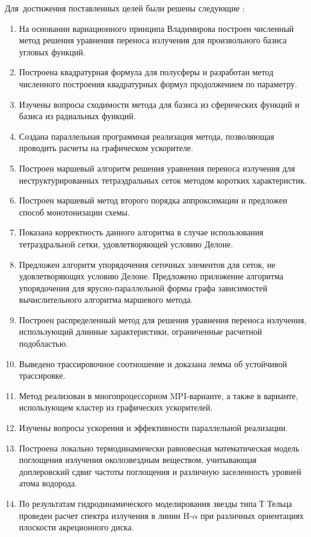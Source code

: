 Для~достижения поставленных целей были решены следующие {\tasks}:
\begin{enumerate}
  \item На основании вариационного принципа Владимирова построен численный метод решения уравнения переноса излучения для произвольного базиса угловых функций.
  \item Построена квадратурная формула для полусферы и разработан метод численного построения квадратурных формул продолжением по параметру.
  \item Изучены вопросы сходимости метода для базиса из сферических функций и базиса из радиальных функций.
  \item Создана параллельная программная реализация метода, позволяющая проводить расчеты на графическом ускорителе.
  
  \item Построен маршевый алгоритм решения уравнения переноса излучения для неструктурированных тетраэдральных сеток методом коротких характеристик.
  \item Построен маршевый метод второго порядка аппроксимации и предложен способ монотонизации схемы.
  \item Показана корректность данного алгоритма в случае использования тетраэдральной сетки, удовлетворяющей условию Делоне.
  \item Предложен алгоритм упорядочения сеточных элементов для сеток, не удовлетворяющих условию Делоне. Предложено приложение алгоритма упорядочения для ярусно-параллельной формы графа зависимостей вычислительного алгоритма маршевого метода.
  
  \item Построен распределенный метод для решения уравнения переноса излучения, использующий длинные характеристики, ограниченные расчетной подобластью.
  \item Выведено трассировочное соотношение и доказана лемма об устойчивой трассировке.
  \item Метод реализован в многопроцессорном MPI-варианте, а также в варианте, использующем кластер из графических ускорителей.
  \item Изучены вопросы ускорения и эффективности параллельной реализации.
  
  \item Построена локально термодинамически равновесная математическая модель поглощения излучения околозвездным веществом, учитывающая доплеровский сдвиг частоты поглощения и различную заселенность уровней атома водорода.
  \item По результатам гидродинамического моделирования звезды типа Т Тельца проведен расчет спектра излучения в линии $\text{H-}\alpha$ при различных ориентациях плоскости акреционного диска.
\end{enumerate}

